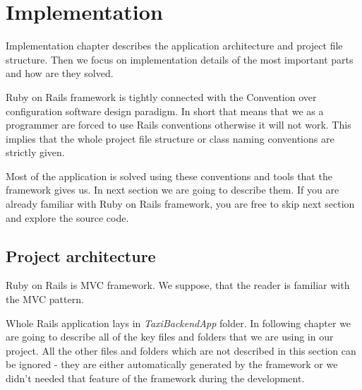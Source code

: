 \chapter{Implementation}
Implementation chapter describes the application architecture and project file structure. Then we focus on implementation details of the most important parts and how are they solved.

Ruby on Rails framework is tightly connected with the Convention over configuration software design paradigm. In short that means that we as a programmer are forced to use Rails conventions otherwise it will not work. This implies that the whole project file structure or class naming conventions are strictly given. 

Most of the application is solved using these conventions and tools that the framework gives us. In next section we are going to describe them. If you are already familiar with Ruby on Rails framework, you are free to skip next section and explore the source code.

\section {Project architecture}
	Ruby on Rails is MVC framework. We suppose, that the reader is familiar with the MVC  pattern.
	
	Whole Rails application lays in \textit{TaxiBackendApp} folder. In following chapter we are going to describe all of the key files and folders that we are using in our project. All the other files and folders which are not described in this section can be ignored - they are either automatically generated by the framework or we didn't needed that feature of the framework during the development.
	
